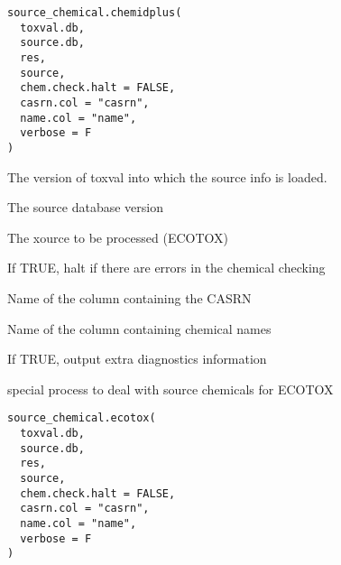 \documentclass[letterpaper]{book}
\begin{document}
%
\begin{Usage}
\begin{verbatim}
source_chemical.chemidplus(
  toxval.db,
  source.db,
  res,
  source,
  chem.check.halt = FALSE,
  casrn.col = "casrn",
  name.col = "name",
  verbose = F
)
\end{verbatim}
\end{Usage}
%
\begin{Arguments}
\begin{ldescription}
\item[\code{toxval.db}] The version of toxval into which the source info is loaded.

\item[\code{source.db}] The source database version

\item[\code{source}] The xource to be processed (ECOTOX)

\item[\code{chem.check.halt}] If TRUE, halt if there are errors in the chemical checking

\item[\code{casrn.col}] Name of the column containing the CASRN

\item[\code{name.col}] Name of the column containing chemical names

\item[\code{verbose}] If TRUE, output extra diagnostics information
\end{ldescription}
\end{Arguments}
%
\begin{Description}\relax
special process to deal with source chemicals for ECOTOX
\end{Description}
%
\begin{Usage}
\begin{verbatim}
source_chemical.ecotox(
  toxval.db,
  source.db,
  res,
  source,
  chem.check.halt = FALSE,
  casrn.col = "casrn",
  name.col = "name",
  verbose = F
)
\end{verbatim}
\end{Usage}
%
\end{document}
